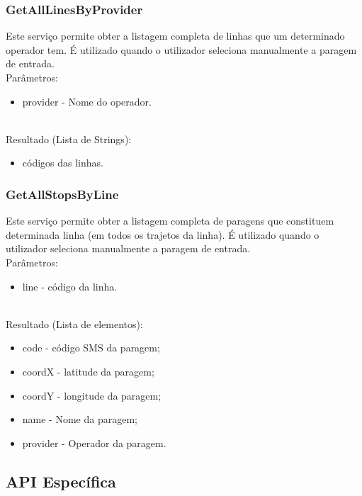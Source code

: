 \subsubsection{GetAllLinesByProvider}

Este serviço permite obter a listagem completa de linhas que um determinado operador tem. É utilizado quando o utilizador seleciona manualmente a paragem de entrada.
\newline
~\\Parâmetros:
\begin{itemize}
\item provider - Nome do operador.
\end{itemize}

~\\Resultado (Lista de Strings):
\begin{itemize}
\item códigos das linhas.
\end{itemize}

\subsubsection{GetAllStopsByLine}

Este serviço permite obter a listagem completa de paragens que constituem determinada linha (em todos os trajetos da linha). É utilizado quando o utilizador seleciona manualmente a paragem de entrada.
\newline
~\\Parâmetros:
\begin{itemize}
\item line - código da linha.
\end{itemize}

~\\Resultado (Lista de elementos):
\begin{itemize}
\item code - código SMS da paragem;
\item coordX - latitude da paragem;
\item coordY - longitude da paragem;
\item name - Nome da paragem;
\item provider - Operador da paragem.
\end{itemize}

\subsection{API Específica}

